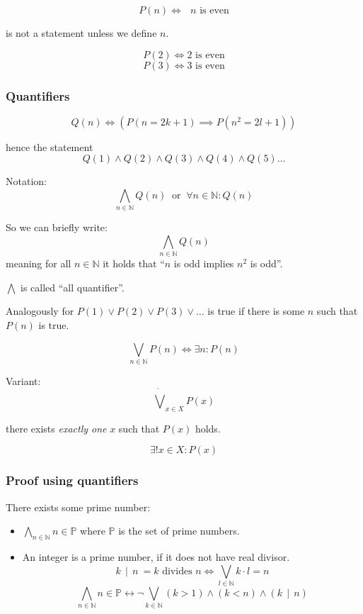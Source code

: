 \documentclass[a4paper,landscape,twocolumn]{article}
\newcommand\divides[2]{#1\,\mid\,#2}
\begin{document}
\[ P(n) \Leftrightarrow \text{ $n$ is even} \]

is not a statement unless we define $n$.

\[ P(2) \Leftrightarrow \text{2 is even} \]
\[ P(3) \Leftrightarrow \text{3 is even} \]

\subsubsection{Quantifiers}

\[ Q(n) \Leftrightarrow \left(P(n = 2k + 1) \implies P(n^2 = 2l + 1)\right) \]

hence the statement
\[ Q(1) \land Q(2) \land Q(3) \land Q(4) \land Q(5) \ldots \]

Notation:
\[ \bigwedge_{n \in \mathbb{N}} Q(n) \:\text{ or }\: \forall n \in \mathbb{N}: Q(n) \]

So we can briefly write:
\[ \bigwedge_{n \in \mathbb{N}} Q(n) \]
meaning for all $n \in \mathbb{N}$ it holds that \enquote{$n$ is odd implies $n^2$ is odd}.

$\bigwedge$ is called \enquote{all quantifier}.

Analogously for $P(1) \lor P(2) \lor P(3) \lor \ldots$ is true if there is some $n$ such that $P(n)$ is true.

\[ \bigvee_{n \in \mathbb{N}} P(n) \Leftrightarrow \exists n: P(n) \]

Variant:
\[ \dot\bigvee_{x \in X} P(x) \]

there exists \emph{exactly one} $x$ such that $P(x)$ holds.

\[ \exists! x \in X: P(x) \]

\subsubsection{Proof using quantifiers}

There exists some prime number:

\begin{itemize}
  \item $\bigwedge_{n \in \mathbb{N}} n \in \mathbb{P}$
        where $\mathbb{P}$ is the set of prime numbers.
  \item An integer is a prime number, if it does not have real divisor.
        \[
            \divides{k}{n} \: = \text{$k$ divides $n$}
            \Leftrightarrow \bigvee_{l \in \mathbb{N}} k\cdot l = n
        \] \[
            \bigwedge_{n \in \mathbb{N}} n \in \mathbb{P}
              \leftrightarrow \neg \bigvee_{k \in \mathbb{N}} (k > 1) \land (k < n) \land (\divides{k}{n})
        \]
\end{itemize}
\end{document}
